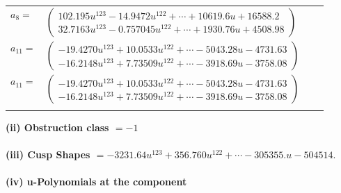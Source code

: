 \documentclass[1p]{elsarticle_modified}
\theoremstyle{definition}
\begin{document}
\begin{tabular}{m{7pt} m{180pt} m{7pt} m{180pt} }
\flushright $a_{8}=$&$\begin{pmatrix}102.195 u^{123}-14.9472 u^{122}+\cdots+10619.6 u+16588.2\\32.7163 u^{123}-0.757045 u^{122}+\cdots+1930.76 u+4508.98\end{pmatrix}$ \\
\flushright $a_{11}=$&$\begin{pmatrix}-19.4270 u^{123}+10.0533 u^{122}+\cdots-5043.28 u-4731.63\\-16.2148 u^{123}+7.73509 u^{122}+\cdots-3918.69 u-3758.08\end{pmatrix}$\\ \flushright $a_{11}=$&$\begin{pmatrix}-19.4270 u^{123}+10.0533 u^{122}+\cdots-5043.28 u-4731.63\\-16.2148 u^{123}+7.73509 u^{122}+\cdots-3918.69 u-3758.08\end{pmatrix}$\\&\end{tabular}
\flushleft \textbf{(ii) Obstruction class $= -1$}\\~\\
\flushleft \textbf{(iii) Cusp Shapes $= -3231.64 u^{123}+356.760 u^{122}+\cdots-305355. u-504514.$}\\~\\
\newpage\renewcommand{\arraystretch}{1}
\flushleft \textbf{(iv) u-Polynomials at the component}\newline \\
\end{document}
